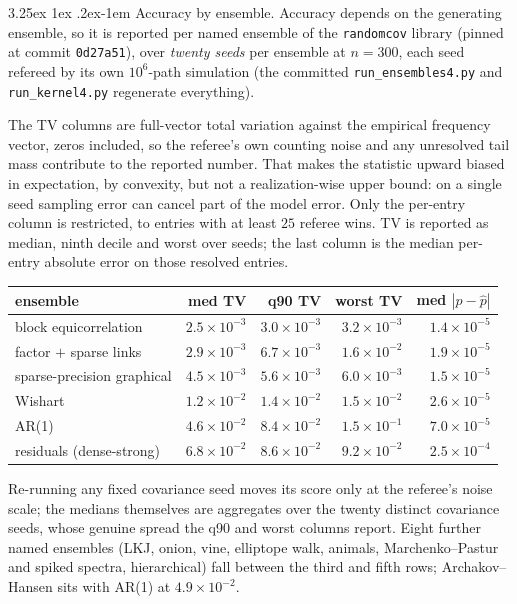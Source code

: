 \documentclass[11pt]{article}
\makeatletter
\renewcommand\paragraph{\@startsection{paragraph}{4}{\z@}%
  {3.25ex \@plus1ex \@minus.2ex}{-1em}%
  {\normalfont\normalsize\itshape}}
\makeatother
\begin{document}
\paragraph{Accuracy by ensemble.} Accuracy depends on the generating ensemble, so it is reported per named
ensemble of the \texttt{randomcov} library (pinned at commit
\texttt{0d27a51}), over \emph{twenty seeds} per ensemble at $n=300$,
each seed refereed by its own $10^6$-path simulation (the committed
\texttt{run\_ensembles4.py} and \texttt{run\_kernel4.py} regenerate
everything).

The TV columns are full-vector total variation against the empirical
frequency vector, zeros included, so the referee's own counting noise and
any unresolved tail mass contribute to the reported number. That makes
the statistic upward biased in expectation, by convexity, but not a
realization-wise upper bound: on a single seed sampling error can cancel
part of the model error. Only the per-entry column is restricted, to
entries with at least $25$ referee wins. TV is reported as median, ninth
decile and worst over seeds; the last column is the median per-entry
absolute error on those resolved entries.

\begin{center}\small
\begin{tabular}{lrrrr}
\toprule
ensemble & med TV & q90 TV & worst TV & med $|p-\hat p|$\\
\midrule
block equicorrelation & $2.5\times10^{-3}$ & $3.0\times10^{-3}$ & $3.2\times10^{-3}$ & $1.4\times10^{-5}$\\
factor $+$ sparse links & $2.9\times10^{-3}$ & $6.7\times10^{-3}$ & $1.6\times10^{-2}$ & $1.9\times10^{-5}$\\
sparse-precision graphical & $4.5\times10^{-3}$ & $5.6\times10^{-3}$ & $6.0\times10^{-3}$ & $1.5\times10^{-5}$\\
Wishart & $1.2\times10^{-2}$ & $1.4\times10^{-2}$ & $1.5\times10^{-2}$ & $2.6\times10^{-5}$\\
AR(1) & $4.6\times10^{-2}$ & $8.4\times10^{-2}$ & $1.5\times10^{-1}$ & $7.0\times10^{-5}$\\
residuals (dense-strong) & $6.8\times10^{-2}$ & $8.6\times10^{-2}$ & $9.2\times10^{-2}$ & $2.5\times10^{-4}$\\
\bottomrule
\end{tabular}
\end{center}

Re-running any fixed covariance seed moves its score only at the
referee's noise scale; the medians themselves are aggregates over the
twenty distinct covariance seeds, whose genuine spread the q90 and worst
columns report. Eight further named
ensembles (LKJ, onion, vine, elliptope walk, animals, Marchenko--Pastur
and spiked spectra, hierarchical) fall between the third and fifth
rows; Archakov--Hansen sits with AR(1) at $4.9\times10^{-2}$.
\end{document}
